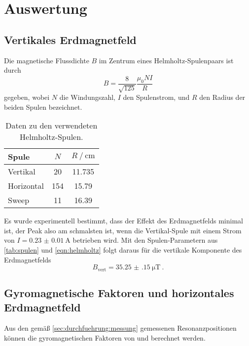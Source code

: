 \section{Auswertung}
\label{sec:auswertung}

\subsection{Vertikales Erdmagnetfeld}

Die magnetische Flussdichte $B$ im Zentrum eines Helmholtz-Spulenpaars ist durch
\begin{equation}
    B = \frac{8}{\sqrt{125}} \frac{\mu_0 NI}{R}
    \label{eqn:helmholtz}
\end{equation}
gegeben,
wobei $N$ die Windungszahl, $I$ den Spulenstrom, und $R$ den Radius der beiden Spulen bezeichnet. %

\begin{table}
    \centering
    \caption{Daten zu den verwendeten Helmholtz-Spulen. \cite{versuchsanleitung}}
    \label{tab:spulen}
    \begin{tabular}{l S S}
        \toprule
        Spule &
        {$N$} &
        {$R \mathbin{/} \si{\centi\meter}$} \\
        \midrule
        Vertikal   &  20 & 11.735 \\
        Horizontal & 154 & 15.79  \\
        Sweep      &  11 & 16.39  \\
        \bottomrule
    \end{tabular}
\end{table}

Es wurde experimentell bestimmt,
dass der Effekt des Erdmagnetfelds minimal ist,
der Peak also am schmalsten ist,
wenn die Vertikal-Spule mit einem Strom von ${ I = \SI{0.23(1)}{\ampere} }$ betrieben wird.
Mit den Spulen-Parametern aus \autoref{tab:spulen} und \autoref{eqn:helmholtz}
folgt daraus für die vertikale Komponente des Erdmagnetfelds
\[ B_\text{vert} = \SI{35.25(15)}{\micro\tesla} \ . \]


\subsection{Gyromagnetische Faktoren und horizontales Erdmagnetfeld}
Aus den gemäß \autoref{sec:durchfuehrung:messung} gemessenen Resonanzpositionen
können die gyromagnetischen Faktoren von  und  berechnet werden.



